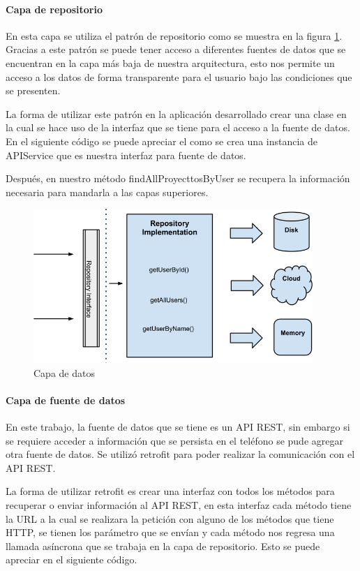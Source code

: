 \paragraph{Capa de repositorio} En esta capa se utiliza el patrón de repositorio como se muestra en la figura \ref{fig:capa-datos}. Gracias a este patrón se puede tener acceso a diferentes fuentes de datos que se encuentran en la capa más baja de nuestra arquitectura, esto nos permite un acceso a los datos de forma transparente para el usuario bajo las condiciones que se presenten.

La forma de utilizar este patrón en la aplicación desarrollado crear una clase en la cual se hace uso de la interfaz que se tiene para el acceso a la fuente de datos. En el siguiente código se puede apreciar el como se crea una instancia de APIService que es nuestra interfaz para fuente de datos.

Después, en nuestro método findAllProyecttosByUser se recupera la información necesaria para mandarla a las capas superiores.



\begin{figure}[h]
    \centering
    \includegraphics[width=400px]{capitulo5/android/img/capa-datos.png}
    \caption{Capa de datos \cite{cleanWay}}
    \label{fig:capa-datos}
\end{figure}

\paragraph{Capa de fuente de datos} En este trabajo, la fuente de datos que se tiene es un API REST, sin embargo si se requiere acceder a información que se persista en el teléfono se pude agregar otra fuente de datos. Se utilizó retrofit para poder realizar la comunicación con el API REST. 

La forma de utilizar retrofit es crear una interfaz con todos los métodos para recuperar o enviar información al API REST, en esta interfaz cada método tiene la URL a la cual se realizara la petición con alguno de los métodos que tiene HTTP, se tienen los parámetro que se envían y cada método nos regresa una llamada asíncrona que se trabaja en la capa de repositorio. Esto se puede apreciar en el siguiente código.

